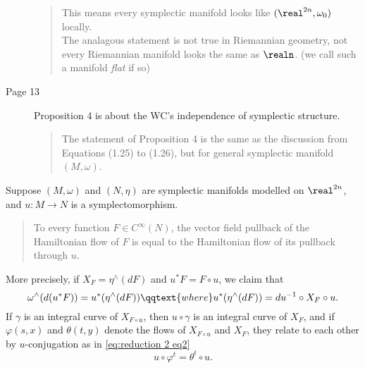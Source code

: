 \documentclass[../main-v2-manifolds.tex]{subfiles}
\begin{document}
\begin{description}
\begin{quote}
	This means every symplectic manifold looks like $(\realtn,\omega_0)$ locally.\\
 
	The analagous statement is not true in Riemannian geometry, not every Riemannian manifold looks the same as $\realn$. (we call such a manifold \emph{flat} if so)
\end{quote}


\item[Page 13]
Proposition 4 is about the WC's independence of symplectic structure.
\begin{quote}
    The statement of Proposition 4 is the same as the discussion from Equations (1.25) to (1.26), but for general symplectic manifold $(M,\omega)$.
\end{quote}
\end{description}
\begin{wts}\label{thm:wc reduction 2 symplectic structure }
    Suppose $(M,\omega)$ and $(N,\eta)$ are symplectic manifolds modelled on $\realtn$, and $u:M\to N$ is a symplectomorphism. 
    \begin{quote}
        To every function $F\in C^\infty(N)$, the vector field pullback of the Hamiltonian flow of $F$ is equal to the Hamiltonian flow of its pullback through $u$.     
    \end{quote}
    More precisely, if $X_F = \eta^{\wedge}(dF)$ and $u^*F = F\circ u$, we claim that
    \begin{equation}
        \omega^{\wedge}(d(u^* F)) = u^*(\eta^{\wedge}(dF))\qqtext{where} u^*(\eta^{\wedge}(dF)) = du^{-1}\circ X_F\circ u.
        \label{eq:reduction 2 eq1}
    \end{equation}
    If $\gamma$ is an integral curve of $X_{F\circ u}$, then $u\circ \gamma$ is an integral curve of $X_F$, and if $\varphi(s,x)$ and $\theta(t,y)$ denote the flows of $X_{F\circ u}$ and $X_{F}$, they relate to each other by $u$-conjugation as in \cref{eq:reduction 2 eq2}
    \begin{equation}
        u\circ\varphi^t = \theta^t\circ u.
        \label{eq:reduction 2 eq2}
    \end{equation}
\end{wts}
\end{document}
